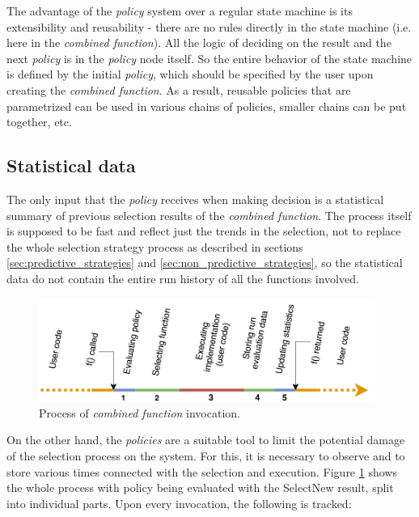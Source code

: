The advantage of the \textit{policy} system over a regular state machine is its extensibility and reusability - there are no rules directly in the state machine (i.e. here in the \textit{combined function}). All the logic of deciding on the result and the next \textit{policy} is in the \textit{policy} node itself. So the entire behavior of the state machine is defined by the initial \textit{policy}, which should be specified by the user upon creating the \textit{combined function}. As a result, reusable policies that are parametrized can be used in various chains of policies, smaller chains can be put together, etc.

\subsection{Statistical data}
\label{subsec:statistical_data}

The only input that the \textit{policy} receives when making decision is a statistical summary of previous selection results of the \textit{combined function}. The process itself is supposed to be fast and reflect just the trends in the selection, not to replace the whole selection strategy process as described in sections \ref{sec:predictive_strategies} and \ref{sec:non_predictive_strategies}, so the statistical data do not contain the entire run history of all the functions involved.

\begin{figure}[h!]
	\captionsetup{justification=centering,margin=0.5cm}
	\centerline{\mbox{\includegraphics[width=110mm]{./img/run_schema.png}}}
	\caption{Process of \textit{combined function} invocation.}
	\label{fig:run_schema}
\end{figure}

On the other hand, the \textit{policies} are a suitable tool to limit the potential damage of the selection process on the system. For this, it is necessary to observe and to store various times connected with the selection and execution. Figure \ref{fig:run_schema} shows the whole process with policy being evaluated with the SelectNew result, split into individual parts. Upon every invocation, the following is tracked:

